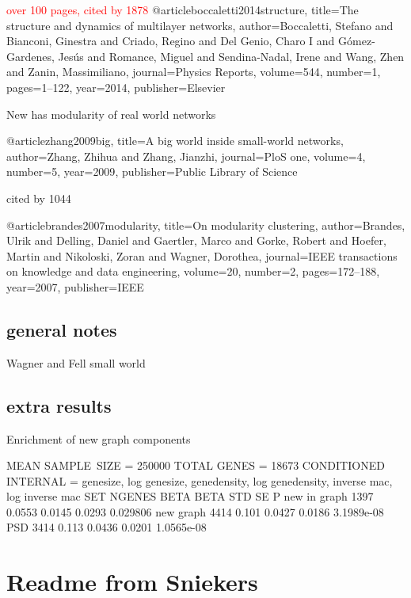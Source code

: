 \textcolor{red}{over 100 pages, cited by 1878}
@article{boccaletti2014structure,
  title={The structure and dynamics of multilayer networks},
  author={Boccaletti, Stefano and Bianconi, Ginestra and Criado, Regino and Del Genio, Charo I and G{\'o}mez-Gardenes, Jes{\'u}s and Romance, Miguel and Sendina-Nadal, Irene and Wang, Zhen and Zanin, Massimiliano},
  journal={Physics Reports},
  volume={544},
  number={1},
  pages={1--122},
  year={2014},
  publisher={Elsevier}
}

New has modularity of real world networks

@article{zhang2009big,
  title={A big world inside small-world networks},
  author={Zhang, Zhihua and Zhang, Jianzhi},
  journal={PloS one},
  volume={4},
  number={5},
  year={2009},
  publisher={Public Library of Science}
}

cited by 1044

@article{brandes2007modularity,
  title={On modularity clustering},
  author={Brandes, Ulrik and Delling, Daniel and Gaertler, Marco and Gorke, Robert and Hoefer, Martin and Nikoloski, Zoran and Wagner, Dorothea},
  journal={IEEE transactions on knowledge and data engineering},
  volume={20},
  number={2},
  pages={172--188},
  year={2007},
  publisher={IEEE}
}


\subsection{general notes}
Wagner and Fell small world

\subsection{extra results}
Enrichment of new graph components


 MEAN SAMPLE\ SIZE = 250000
 TOTAL GENES = 18673
 CONDITIONED INTERNAL = genesize, log genesize, genedensity, log genedensity, inverse mac, log inverse mac
SET           NGENES       BETA   BETA STD         SE            P
new in graph    1397     0.0553     0.0145     0.0293     0.029806
new graph       4414      0.101     0.0427     0.0186   3.1989e-08
PSD             3414      0.113     0.0436     0.0201   1.0565e-08



\section{Readme from Sniekers}
\label{sec:notes readme from sniekers}


